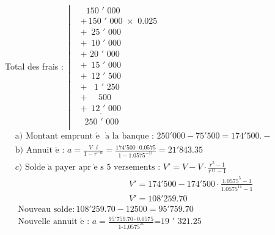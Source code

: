 \begin{solution}
Total des frais : $\,\left| \begin{array}{ll}
  & \,\,\,\,\text{150 }\!\!'\!\!\text{ 000} \\ 
 & \text{+}\,\text{150 }\!\!'\!\!\text{ 000 }\!\!\times\!\!\text{ 0}\text{.025} \\ 
 & \text{+}\,\,\,\text{25 }\!\!'\!\!\text{ 000} \\ 
 & \text{+}\,\,\,\text{10 }\!\!'\!\!\text{ 000} \\ 
 & \text{+}\,\,\text{20 }\!\!'\!\!\text{ 000} \\ 
 & \text{+}\,\,\,\text{15 }\!\!'\!\!\text{ 000} \\ 
 & \text{+}\,\,\,\text{12 }\!\!'\!\!\text{ 500} \\ 
 & \text{+}\,\,\,\,\,\text{1 }\!\!'\!\!\text{ 250} \\ 
 & \text{+}\,\,\,\,\,\,\,\,\text{500} \\ 
 & \underline{\text{+}\,\,\,\text{12 }\!\!'\!\!\text{ 000}} \\ 
 & \,\,\,\text{250 }\!\!'\!\!\text{ 000} \\ 
\end{array} \right.$
$\begin{array}{ll}
  & \text{a) Montant emprunt }\!\!\acute{\mathrm{e}}\!\!\text{   }\!\!\grave{\mathrm{a}}\!\!\text{  la banque : }250'000-75'500=174'500.- \\ 
 & \text{b) Annuit }\!\!\acute{\mathrm{e}}\!\!\text{  : }a=\frac{V\cdot i}{1-{{r}^{-n}}}=\frac{174'500\cdot 0.0575}{1-{{1.0575}^{-11}}}=21'843.35 \\ 
 & c)\text{ Solde  }\!\!\grave{\mathrm{a}}\!\!\text{  payer apr }\!\!\grave{\mathrm{e}}\!\!\text{ s 5 versements : }{V}'=V-V\cdot \frac{{{r}^{5}}-1}{{{r}^{11}}-1} \\ 
 & \,\,\,\,\,\,\,\,\,\,\,\,\,\,\,\,\,\,\,\,\,\,\,\,\,\,\,\,\,\,\,\,\,\,\,\,\,\,\,\,\,\,\,\,\,\,\,\,\,\,\,\,\,\,\,\,\,\,\,\,\,\,\,\,\,\,\,\,\,\,\,\,\,\,\,\,\,\,\,\,{V}'=174'500-174'500\cdot \frac{{{1.0575}^{5}}-1}{{{1.0575}^{11}}-1} \\ 
 & \,\,\,\,\,\,\,\,\,\,\,\,\,\,\,\,\,\,\,\,\,\,\,\,\,\,\,\,\,\,\,\,\,\,\,\,\,\,\,\,\,\,\,\,\,\,\,\,\,\,\,\,\,\,\,\,\,\,\,\,\,\,\,\,\,\,\,\,\,\,\,\,\,\,\,\,\,\,\,\,{V}'=108'259.70 \\ 
 & \text{    Nouveau solde}:108'259.70-12500=95'759.70 \\ 
 & \text{    Nouvelle annuit }\!\!\acute{\mathrm{e}}\!\!\text{  : }a=\frac{95'759.70\cdot 0.0575}{\text{1-1}\text{,057}{{\text{5}}^{\text{-6}}}}\text{=19 }\!\!'\!\!\text{ 321}\text{.25 } \\ 
\end{array}$


\end{solution}
